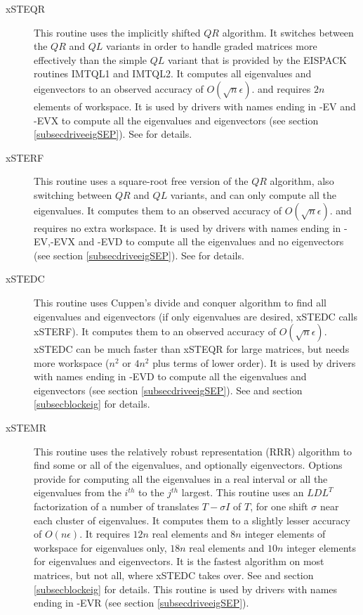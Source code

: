 \begin{description}

\item[xSTEQR]
This routine uses the implicitly shifted $QR$ algorithm.
It switches between the $QR$ and $QL$ variants in order to
handle graded matrices more effectively than the simple $QL$ variant that
is provided by the EISPACK routines IMTQL1 and IMTQL2.
It computes all eigenvalues and eigenvectors to an observed accuracy of $O(\sqrt{n}\epsilon)$.
and requires $2n$ elements of workspace. 
It is used by drivers with names ending in -EV and -EVX to compute
all the eigenvalues and eigenvectors (see section \ref{subsecdriveeigSEP}).
See \cite{greenbaumdongarra} for details.

\item[xSTERF]
This routine uses a square-root free version of the $QR$
algorithm, also switching between $QR$ and $QL$ variants, and can only
compute all the eigenvalues. It computes them to an observed accuracy of $O(\sqrt{n}\epsilon)$.
and requires no extra workspace.
It is used by drivers with names ending in -EV,-EVX and -EVD to compute
all the eigenvalues and no eigenvectors (see section \ref{subsecdriveeigSEP}).
See \cite{greenbaumdongarra} for details.

\item[xSTEDC]
This routine uses Cuppen's divide and conquer algorithm
to find all eigenvalues and eigenvectors (if only eigenvalues
are desired, xSTEDC calls xSTERF). 
 It computes them to an observed accuracy of $ O(\sqrt{n}\epsilon)$.
xSTEDC can be much faster than xSTEQR for large matrices,
but needs more workspace ($n^2$ or $4n^2$ plus terms of lower order).
It is used by drivers with names ending in -EVD to compute all the
eigenvalues and eigenvectors (see section \ref{subsecdriveeigSEP}).
See \cite{cuppen,gueisenstat,rutter} and section \ref{subsecblockeig}
for details.

\item[xSTEMR]
This routine uses the relatively robust representation (RRR) algorithm to
find some or all of the eigenvalues, and optionally eigenvectors. 
Options provide for computing all the eigenvalues in a real interval or
all the eigenvalues from the $i^{th}$ to the $j^{th}$ largest.
This routine uses an $LDL^T$ factorization
of a number of translates $T - \sigma I$ of $T$, for one shift $\sigma$ near each cluster
of eigenvalues.
It computes them to a slightly lesser accuracy of $O(n\epsilon)$.
It requires $12n$ real elements and $8n$ integer elements of workspace for eigenvalues only,
$18n$ real elements and $10n$ integer elements for eigenvalues and eigenvectors.
It is the fastest algorithm on most matrices, but not all, where xSTEDC takes over.
See \cite{parlettdhillon00,parlettmarques00,dhillonparlett03,
dhillonparlett04,marquesetal05,dhillonetal06} 
and section \ref{subsecblockeig} for details.
This routine is used by drivers with names ending in -EVR (see section \ref{subsecdriveeigSEP}).


\end{description}
